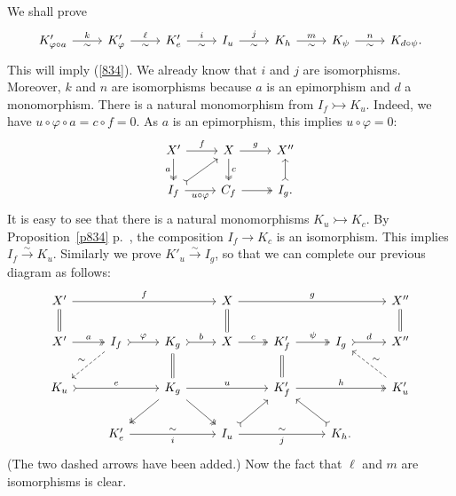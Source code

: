 \documentclass[12pt]{article}%
\theoremstyle{remark}
\theoremstyle{definition}
\newcommand{\pp}{\varphi}
\newcommand{\mono}{\rightarrowtail}%
\newcommand{\xr}{\xrightarrow}
\begin{document}
We shall prove 
$$
\begin{tikzcd}
K'_{\varphi\circ a}\ar{r}{k}[swap]{\sim}&K'_\varphi\ar{r}{\ell}[swap]{\sim}&K'_e\ar{r}{i}[swap]{\sim}&I_u\ar{r}{j}[swap]{\sim}&K_h\ar{r}{m}[swap]{\sim}&K_\psi\ar{r}{n}[swap]{\sim}&K_{d\circ\psi}.
\end{tikzcd}
$$
This will imply (\ref{834}). We already know that $i$ and $j$ are isomorphisms. Moreover, $k$ and $n$ are isomorphisms because $a$ is an epimorphism and $d$ a monomorphism. There is a natural monomorphism from $I_f\mono K_u$. Indeed, we have $u\circ\pp\circ a=c\circ f=0$. As $a$ is an epimorphism, this implies $u\circ\pp=0$: 
$$
\begin{tikzcd}
X'\ar[two heads]{d}[swap]{a}\ar{r}{f}&X\ar[two heads]{d}{c}\ar{r}{g}&X''\\ 
I_f\ar[tail]{ru}\ar{r}[swap]{u\circ\pp}&C_f\ar[two heads]{r}&I_g.\ar[tail]{u}
\end{tikzcd}
$$
It is easy to see that there is a natural monomorphisms $K_u\mono K_c$. By Proposition~\ref{p834} p.~\pageref{p834}, the composition $I_f\to K_c$ is an isomorphism. This implies $I_f\xr\sim K_u$. Similarly we prove $K'_u\xr\sim I_g$, so that we can complete our previous diagram as follows: 
$$
\begin{tikzcd}
X'\ar{rrr}{f}\ar[equal]{d}&&&X\ar[equal]{d}\ar{rrr}{g}&&&X''\ar[equal]{d}\\ 
X'\ar[two heads]{r}{a}&I_f\ar[dashed]{dl}[swap]{\sim}\ar[tail]{r}{\varphi}&K_g\ar[equal]{d}\ar[tail]{r}{b}&X\ar[two heads]{r}{c}&K'_f\ar[equal]{d}\ar[two heads]{r}{\psi}&I_g\ar[tail]{r}{d}&X''\\ 
K_u\ar[tail]{rr}{e}&&K_g\ar[two heads]{dl}\ar[two heads]{dr}\ar{rr}{u}&&K'_f\ar[two heads]{rr}{h}&&K'_u\ar[dashed]{ul}[swap]{\sim}\\ 
&K'_e\ar{rr}{\sim}[swap]{i}&&I_u\ar[tail]{ur}\ar{rr}{\sim}[swap]{j}&&K_h.\ar[tail]{ul}
\end{tikzcd}
$$ 
(The two dashed arrows have been added.) Now the fact that $\ell$ and $m$ are isomorphisms is clear.
%
%
\end{document}
